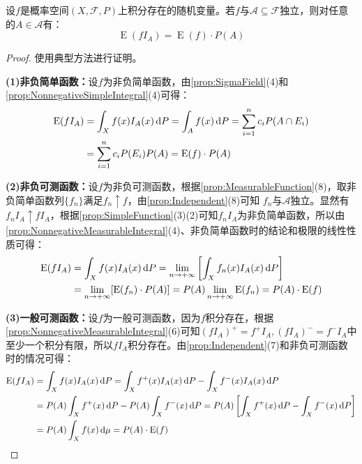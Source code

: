 \begin{lemma}\label{lem:IndependentExpectation}
	设$f$是概率空间$(X,\mathscr{F},P)$上积分存在的随机变量。若$f$与$\mathscr{A}\subseteq\mathscr{F}$独立，则对任意的$A\in\mathscr{A}$有：
	\begin{equation*}
		\operatorname{E}(fI_A)=\operatorname{E}(f)\cdot P(A)
	\end{equation*}
\end{lemma}
\begin{proof}
	使用典型方法进行证明。\par
	\textbf{(1)非负简单函数：}设$f$为非负简单函数，由\cref{prop:SigmaField}(4)和\cref{prop:NonnegativeSimpleIntegral}(4)可得：
	\begin{align*}
		\operatorname{E}(fI_A)&=\int_{X}f(x)I_A(x)\mathop{}\!\mathrm{d} P=\int_{A}f(x)\mathop{}\!\mathrm{d} P=\sum_{i=1}^{n}c_iP(A\cap E_i) \\
		&=\sum_{i=1}^{n}c_iP(E_i)P(A)=\operatorname{E}(f)\cdot P(A)
	\end{align*}\par
	\textbf{(2)非负可测函数：}设$f$为非负可测函数，根据\cref{prop:MeasurableFunction}(8)，取非负简单函数列$\{f_n\}$满足$f_n\uparrow f$，由\cref{prop:Independent}(8)可知 $f_n$与$\mathscr{A}$独立。显然有$f_nI_A\uparrow fI_A$，根据\cref{prop:SimpleFunction}(3)(2)可知$f_nI_A$为非负简单函数，所以由\cref{prop:NonnegativeMeasurableIntegral}(4)、非负简单函数时的结论和极限的线性性质可得：
	\begin{align*}
		\operatorname{E}(fI_A)&=\int_{X}f(x)I_A(x)\mathop{}\!\mathrm{d} P=\lim_{n\to+\infty}\left[\int_{X}f_n(x)I_A(x)\mathop{}\!\mathrm{d} P\right] \\
		&=\lim_{n\to+\infty}[\operatorname{E}(f_n)\cdot P(A)]=P(A)\lim_{n\to+\infty}\operatorname{E}(f_n)=P(A)\cdot\operatorname{E}(f)
	\end{align*}\par
	\textbf{(3)一般可测函数：}设$f$为一般可测函数，因为$f$积分存在，根据\cref{prop:NonnegativeMeasurableIntegral}(6)可知$(fI_A)^+=f^+I_A,(fI_A)^-=f^-I_A$中至少一个积分有限，所以$fI_A$积分存在。由\cref{prop:Independent}(7)和非负可测函数时的情况可得：
	\begin{align*}
		\operatorname{E}(fI_A)&=\int_{X}f(x)I_A(x)\dif P=\int_{X}f^+(x)I_A(x)\dif P-\int_{X}f^-(x)I_A(x)\dif P \\
		&=P(A)\int_{X}f^+(x)\dif P-P(A)\int_{X}f^-(x)\dif P=P(A)\left[\int_{X}f^+(x)\dif P-\int_{X}f^-(x)\dif P\right] \\
		&=P(A)\int_{X}f(x)\dif\mu=P(A)\cdot\operatorname{E}(f)\qedhere
	\end{align*}
\end{proof}
